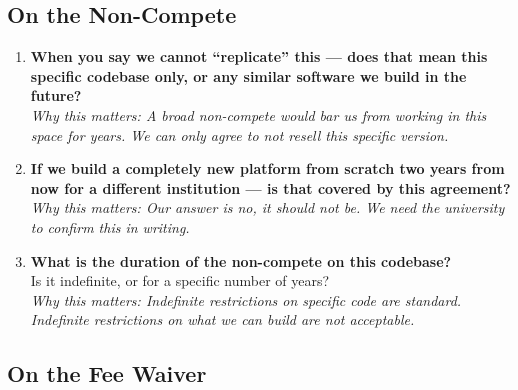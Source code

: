 \documentclass[12pt,a4paper]{article}
\begin{document}
\subsection{On the Non-Compete}

\begin{enumerate}[leftmargin=*, label=\textbf{Q\arabic*.}, resume]

    \item \textbf{When you say we cannot ``replicate'' this — does that mean this specific codebase only, or any similar software we build in the future?}\\
    \textit{Why this matters: A broad non-compete would bar us from working in this space for years. We can only agree to not resell this specific version.}

    \item \textbf{If we build a completely new platform from scratch two years from now for a different institution — is that covered by this agreement?}\\
    \textit{Why this matters: Our answer is no, it should not be. We need the university to confirm this in writing.}

    \item \textbf{What is the duration of the non-compete on this codebase?}\\
    Is it indefinite, or for a specific number of years?\\
    \textit{Why this matters: Indefinite restrictions on specific code are standard. Indefinite restrictions on what we can build are not acceptable.}

\end{enumerate}

\subsection{On the Fee Waiver}
\end{document}
